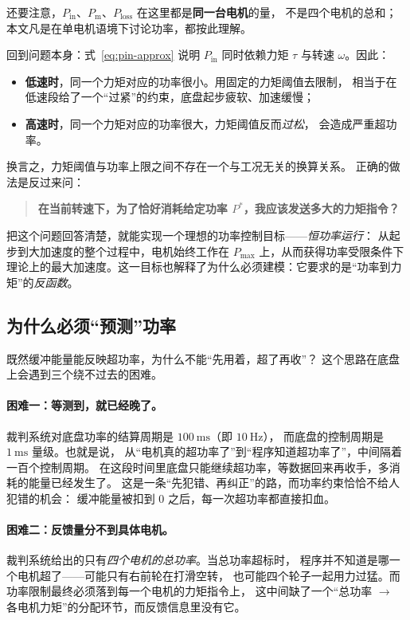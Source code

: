 \documentclass[cn,blue,11pt,device=normal]{elegantnote}
\newcommand{\Pin}{P_{\mathrm{in}}{}}
\newcommand{\Pmech}{P_{\mathrm{m}}{}}
\newcommand{\Pmax}{P_{\max}{}}
\newcommand{\fref}[1]{式~\eqref{#1}}
\begin{document}
还要注意，$\Pin$、$\Pmech$、$P_{\mathrm{loss}}$ 在这里都是\textbf{同一台电机}的量，
不是四个电机的总和；本文凡是在单电机语境下讨论功率，都按此理解。

回到问题本身：\fref{eq:pin-approx} 说明 $\Pin$ 同时依赖力矩 $\tau$ 与转速 $\omega$。因此：

\begin{itemize}
  \item \textbf{低速时}，同一个力矩对应的功率很小。用固定的力矩阈值去限制，
  相当于在低速段给了一个“过紧”的约束，底盘起步疲软、加速缓慢；
  \item \textbf{高速时}，同一个力矩对应的功率很大，力矩阈值反而\emph{过松}，
  会造成严重超功率。
\end{itemize}

换言之，力矩阈值与功率上限之间不存在一个与工况无关的换算关系。
正确的做法是反过来问：

\begin{quote}
\textbf{在当前转速下，为了恰好消耗给定功率 $P^\ast$，我应该发送多大的力矩指令？}
\end{quote}

把这个问题回答清楚，就能实现一个理想的功率控制目标——\emph{恒功率运行}：
从起步到大加速度的整个过程中，电机始终工作在 $\Pmax$ 上，从而获得功率受限条件下
理论上的最大加速度。这一目标也解释了为什么必须建模：它要求的是“功率到力矩”的\emph{反函数}。

\subsection{为什么必须“预测”功率}\label{sec:whypredict}

既然缓冲能量能反映超功率，为什么不能“先用着，超了再收”？
这个思路在底盘上会遇到三个绕不过去的困难。

\paragraph{困难一：等测到，就已经晚了。}
裁判系统对底盘功率的结算周期是 $100\ \mathrm{ms}$（即 $10\ \mathrm{Hz}$）\cite{rm2024rules}，
而底盘的控制周期是 $1\ \mathrm{ms}$ 量级。也就是说，
从“电机真的超功率了”到“程序知道超功率了”，中间隔着一百个控制周期。
在这段时间里底盘只能继续超功率，等数据回来再收手，多消耗的能量已经发生了。
这是一条“先犯错、再纠正”的路，而功率约束恰恰不给人犯错的机会：
缓冲能量被扣到 $0$ 之后，每一次超功率都直接扣血。

\paragraph{困难二：反馈量分不到具体电机。}
裁判系统给出的只有\emph{四个电机的总功率}。当总功率超标时，
程序并不知道是哪一个电机超了——可能只有右前轮在打滑空转，
也可能四个轮子一起用力过猛。而功率限制最终必须落到每一个电机的力矩指令上，
这中间缺了一个“总功率 $\to$ 各电机力矩”的分配环节，而反馈信息里没有它。
\end{document}
